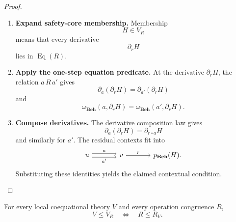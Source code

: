 \begin{proof}
    \leavevmode
    \begin{enumerate}
        \item \textbf{Expand safety-core membership.}
        Membership
        \[
            H\in V_R
        \]
        means that every derivative
        \[
            \partial_rH
        \]
        lies in \(\operatorname{Eq}(R)\).

        \item \textbf{Apply the one-step equation predicate.}
        At the derivative \(\partial_rH\), the relation \(a\,R\,a'\) gives
        \[
            \partial_a(\partial_rH)
            =
            \partial_{a'}(\partial_rH)
        \]
        and
        \[
            \omega_{\mathbf{Beh}}(a,\partial_rH)
            =
            \omega_{\mathbf{Beh}}(a',\partial_rH).
        \]

        \item \textbf{Compose derivatives.}
        The derivative composition law gives
        \[
            \partial_a(\partial_rH)
            =
            \partial_{r\circ a}H
        \]
        and similarly for \(a'\). The residual contexts fit into
        \[
        \begin{tikzcd}[column sep=large]
            u
                \arrow[r, shift left=.6ex, "a"]
                \arrow[r, shift right=.6ex, "a'"']
            &
            v
                \arrow[r, "r"]
            &
            p_{\mathbf{Beh}}(H).
        \end{tikzcd}
        \]
        Substituting these identities yields the claimed contextual
        condition.
    \end{enumerate}
\end{proof}

\begin{theorem}
\label{thm:to-operational-soundness-completeness}
    For every local coequational theory \(V\) and every operation congruence
    \(R\),
    \[
        V\leq V_R
        \quad\Longleftrightarrow\quad
        R\leq R_V.
    \]
\end{theorem}

